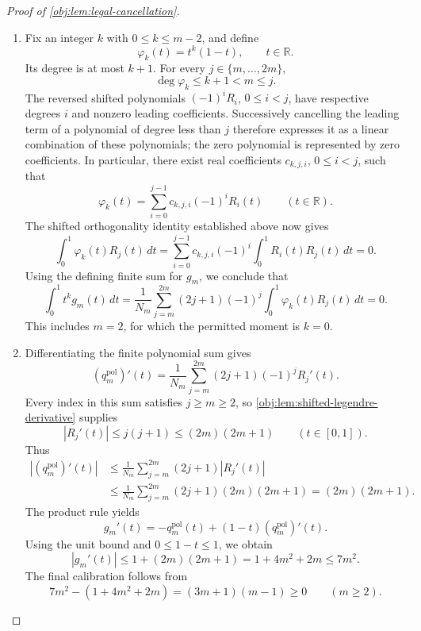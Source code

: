 \begin{proof}[Proof of \cref{obj:lem:legal-cancellation}]
\begin{enumerate}
\item Fix an integer \(k\) with \(0\le k\le m-2\), and define
\[
\varphi_k(t)=t^k(1-t),\qquad t\in\mathbb R.
\]
Its degree is at most \(k+1\). For every \(j\in\{m,\ldots,2m\}\),
\[
\deg\varphi_k\le k+1<m\le j.
\]
The reversed shifted polynomials \((-1)^iR_i\), \(0\le i<j\), have respective degrees \(i\) and nonzero leading coefficients. Successively cancelling the leading term of a polynomial of degree less than \(j\) therefore expresses it as a linear combination of these polynomials; the zero polynomial is represented by zero coefficients. In particular, there exist real coefficients \(c_{k,j,i}\), \(0\le i<j\), such that
\[
\varphi_k(t)=\sum_{i=0}^{j-1}c_{k,j,i}(-1)^iR_i(t)
\qquad(t\in\mathbb R).
\]
The shifted orthogonality identity established above now gives
\[
\int_0^1\varphi_k(t)R_j(t)\,dt
=\sum_{i=0}^{j-1}c_{k,j,i}(-1)^i
\int_0^1R_i(t)R_j(t)\,dt
=0.
\]
Using the defining finite sum for \(g_m\), we conclude that
\[
\int_0^1t^kg_m(t)\,dt
=\frac1{N_m}\sum_{j=m}^{2m}(2j+1)(-1)^j
\int_0^1\varphi_k(t)R_j(t)\,dt
=0.
\]
This includes \(m=2\), for which the permitted moment is \(k=0\).

\item Differentiating the finite polynomial sum gives
\[
(q_m^{\mathrm{pol}})'(t)
=\frac1{N_m}\sum_{j=m}^{2m}(2j+1)(-1)^jR_j'(t).
\]
Every index in this sum satisfies \(j\ge m\ge2\), so \cref{obj:lem:shifted-legendre-derivative} supplies
\[
|R_j'(t)|\le j(j+1)\le(2m)(2m+1)
\qquad(t\in[0,1]).
\]
Thus
\[
\begin{aligned}
|(q_m^{\mathrm{pol}})'(t)|
&\le\frac1{N_m}\sum_{j=m}^{2m}(2j+1)|R_j'(t)|\\
&\le\frac1{N_m}\sum_{j=m}^{2m}(2j+1)(2m)(2m+1)
=(2m)(2m+1).
\end{aligned}
\]
The product rule yields
\[
g_m'(t)=-q_m^{\mathrm{pol}}(t)
+(1-t)(q_m^{\mathrm{pol}})'(t).
\]
Using the unit bound and \(0\le1-t\le1\), we obtain
\[
|g_m'(t)|
\le1+(2m)(2m+1)
=1+4m^2+2m
\le7m^2.
\]
The final calibration follows from
\[
7m^2-(1+4m^2+2m)=(3m+1)(m-1)\ge0
\qquad(m\ge2).
\]


\end{enumerate}
\end{proof}

